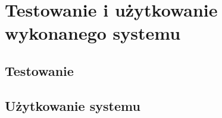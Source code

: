 \chapter{Testowanie i użytkowanie wykonanego systemu}

\section[Testowanie][Testowanie]{Testowanie}

\section[Użytkowanie systemu][Użytkowanie systemu]{Użytkowanie systemu}

